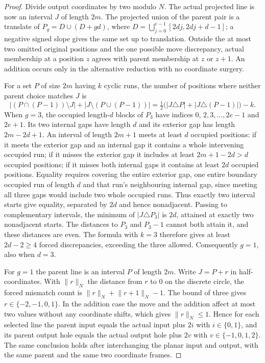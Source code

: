 \documentclass[11pt,colorlinks]{charlie}
\newcommand{\norm}[1]{\lVert #1\rVert}
\begin{document}
\begin{proof}
Divide output coordinates by two modulo $N$. The actual projected line is now an interval $J$ of length $2m$. The projected union of the parent pair is a translate of $P_g=D\cup(D+gd)$, where $D=\bigcup_{j=0}^{e-1}[2dj,2dj+d-1]$; a negative signed slope gives the same set up to translation. Outside the at most two omitted original positions and the one possible move discrepancy, actual membership at a position $z$ agrees with parent membership at $z$ or $z+1$. An addition occurs only in the alternative reduction with no coordinate surgery.

For a set $P$ of size $2m$ having $k$ cyclic runs, the number of positions where neither parent choice matches $J$ is
\[
|(P\cap(P-1))\setminus J|+|J\setminus(P\cup(P-1))|=\tfrac12\bigl(|J\triangle P|+|J\triangle(P-1)|\bigr)-k .
\]
When $g=3$, the occupied length-$d$ blocks of $P_3$ have indices $0$, $2,3,\ldots,2e-1$ and $2e+1$. Its two internal gaps have length $d$ and its exterior gap has length $2m-2d+1$. An interval of length $2m+1$ meets at least $d$ occupied positions: if it meets the exterior gap and an internal gap it contains a whole intervening occupied run; if it misses the exterior gap it includes at least $2m+1-2d>d$ occupied positions; if it misses both internal gaps it contains at least $2d$ occupied positions. Equality requires covering the entire exterior gap, one entire boundary occupied run of length $d$ and that run's neighbouring internal gap, since meeting all three gaps would include two whole occupied runs. Thus exactly two interval starts give equality, separated by $2d$ and hence nonadjacent. Passing to complementary intervals, the minimum of $|J\triangle P_3|$ is $2d$, attained at exactly two nonadjacent starts. The distances to $P_3$ and $P_3-1$ cannot both attain it, and these distances are even. The formula with $k=3$ therefore gives at least $2d-2\ge4$ forced discrepancies, exceeding the three allowed. Consequently $g=1$, also when $d=3$.

For $g=1$ the parent line is an interval $P$ of length $2m$. Write $J=P+r$ in half-coordinates. With $\norm{r}_N$ the distance from $r$ to $0$ on the discrete circle, the forced mismatch count is $\norm{r}_N+\norm{r+1}_N-1$. The bound of three gives $r\in\{-2,-1,0,1\}$. In the addition case the move and the addition affect at most two values without any coordinate shifts, which gives $\norm{r}_N\le1$. Hence for each selected line the parent input equals the actual input plus $2i$ with $i\in\{0,1\}$, and its parent output hole equals the actual output hole plus $2v$ with $v\in\{-1,0,1,2\}$. The same conclusion holds after interchanging the planar input and output, with the same parent and the same two coordinate frames.


\end{proof}
\end{document}
